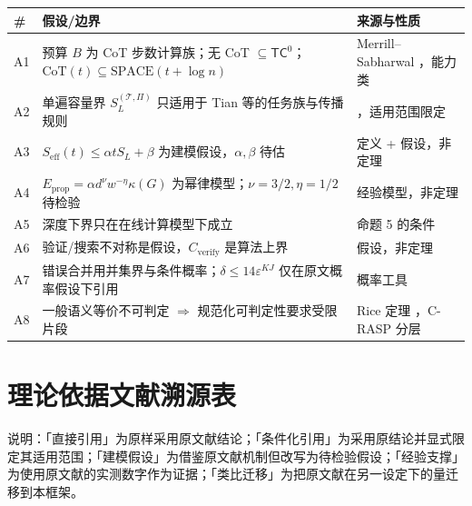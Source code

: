 \documentclass[11pt]{ctexart}
\begin{document}
\begin{center}
\begin{tabular}{p{1.0cm}p{7.6cm}p{5.8cm}}
\toprule
\textbf{\#} & \textbf{假设/边界} & \textbf{来源与性质} \\
\midrule
A1 & 预算 $B$ 为 CoT 步数计算族；无 CoT $\subseteq\mathsf{TC}^0$；$\mathrm{CoT}(t)\subseteq\mathrm{SPACE}(t+\log n)$ & Merrill--Sabharwal \cite{cotexpressive}，能力类 \\
A2 & 单遍容量界 $S_L^{(\mathcal{T},\Pi)}$ 只适用于 Tian 等的任务族与传播规则 & \cite{tian}，适用范围限定 \\
A3 & $S_{\mathrm{eff}}(t)\le\alpha tS_L+\beta$ 为建模假设，$\alpha,\beta$ 待估 & 定义 + 假设，非定理 \\
A4 & $E_{\mathrm{prop}}=\alpha d^{\nu}w^{-\eta}\kappa(G)$ 为幂律模型；$\nu=3/2,\eta=1/2$ 待检验 & 经验模型，非定理 \\
A5 & 深度下界只在在线计算模型下成立 & 命题 5 的条件 \\
A6 & 验证/搜索不对称是假设，$C_{\mathrm{verify}}$ 是算法上界 & 假设，非定理 \\
A7 & 错误合并用并集界与条件概率；$\delta\le14\varepsilon^{KJ}$ 仅在原文概率假设下引用 & 概率工具 \\
A8 & 一般语义等价不可判定 $\Rightarrow$ 规范化可判定性要求受限片段 & Rice 定理 \cite{symmetries}，C-RASP 分层 \cite{lenbound} \\
\bottomrule
\end{tabular}
\end{center}

\appendix
\section{理论依据文献溯源表}

\begin{center}
\small 说明：「直接引用」为原样采用原文献结论；「条件化引用」为采用原结论并显式限定其适用范围；「建模假设」为借鉴原文献机制但改写为待检验假设；「经验支撑」为使用原文献的实测数字作为证据；「类比迁移」为把原文献在另一设定下的量迁移到本框架。
\end{center}
\end{document}
